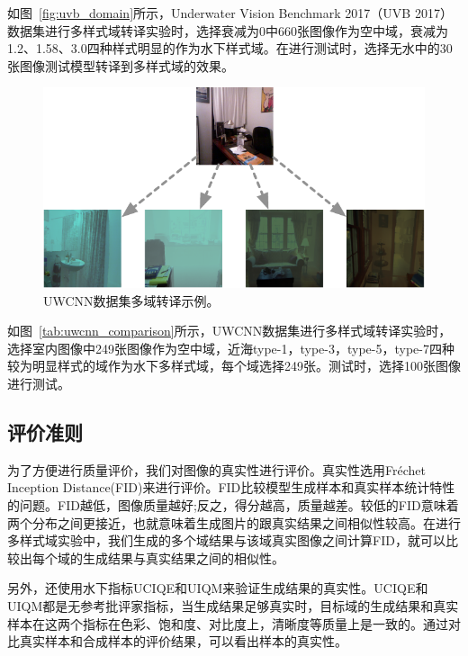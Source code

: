 如图~\ref{fig:uvb_domain}所示，Underwater Vision Benchmark 2017（UVB 2017）数据集进行多样式域转译实验时，选择衰减为0中660张图像作为空中域，衰减为1.2、1.58、3.0四种样式明显的作为水下样式域。在进行测试时，选择无水中的30张图像测试模型转译到多样式域的效果。

\begin{figure}[ht]
    \centering
  \includegraphics[width=\textwidth]{figures/UWCNN_dataset_domain.pdf}
  \caption{UWCNN数据集多域转译示例。}
  \label{fig:uwcnn_domain}
\end{figure}

如图~\ref{tab:uwcnn_comparison}所示，UWCNN数据集进行多样式域转译实验时，选择室内图像中249张图像作为空中域，近海type-1，type-3，type-5，type-7四种较为明显样式的域作为水下多样式域，每个域选择249张。测试时，选择100张图像进行测试。

\subsection{评价准则}
为了方便进行质量评价，我们对图像的真实性进行评价。真实性选用Fréchet Inception Distance(FID)来进行评价。FID比较模型生成样本和真实样本统计特性的问题。FID越低，图像质量越好;反之，得分越高，质量越差。较低的FID意味着两个分布之间更接近，也就意味着生成图片的跟真实结果之间相似性较高。在进行多样式域实验中，我们生成的多个域结果与该域真实图像之间计算FID，就可以比较出每个域的生成结果与真实结果之间的相似性。

另外，还使用水下指标UCIQE和UIQM来验证生成结果的真实性。UCIQE和UIQM都是无参考批评家指标，当生成结果足够真实时，目标域的生成结果和真实样本在这两个指标在色彩、饱和度、对比度上，清晰度等质量上是一致的。通过对比真实样本和合成样本的评价结果，可以看出样本的真实性。


